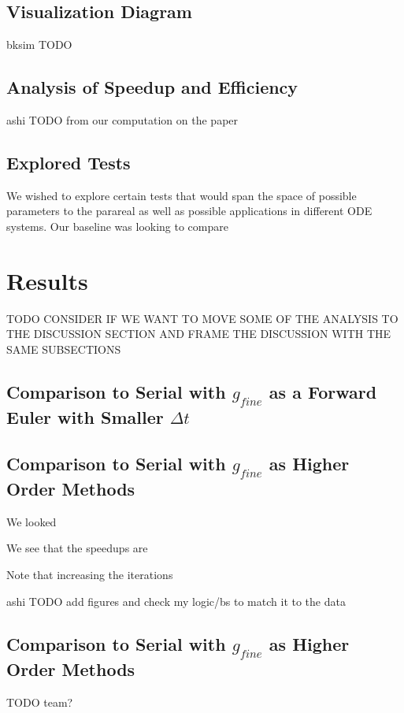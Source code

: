 \documentclass[letterpaper,11pt]{article}
\begin{document}
\subsection{Visualization Diagram}
bksim TODO

\subsection{Analysis of Speedup and Efficiency}

ashi TODO from our computation on the paper

\subsection{Explored Tests}

We wished to explore certain tests that would span the space of possible
parameters to the parareal as well as possible applications in different ODE
systems. Our baseline was looking to compare 

\section{Results}

TODO CONSIDER IF WE WANT TO MOVE SOME OF THE ANALYSIS TO THE DISCUSSION SECTION AND FRAME THE DISCUSSION WITH THE SAME SUBSECTIONS

\subsection{Comparison to Serial with $g_{fine}$ as a Forward Euler with
Smaller $\Delta t$}

\subsection{Comparison to Serial with $g_{fine}$ as Higher Order Methods}

We looked 

We see that the speedups are

Note that increasing the iterations

ashi TODO add figures and check my logic/bs to match it to the data

\subsection{Comparison to Serial with $g_{fine}$ as Higher Order Methods}

TODO team?
\end{document}
